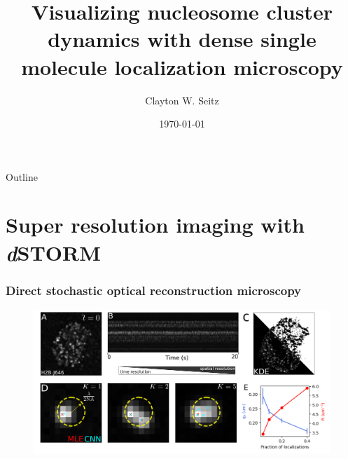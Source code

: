 \documentclass{beamer}					%
\title{Visualizing nucleosome cluster dynamics with dense single molecule localization microscopy}	%
\author{Clayton W. Seitz}								%
\date{\today}									%
\begin{document}
\begin{frame}
  \titlepage
\end{frame}

\begin{frame}{Outline}
    \tableofcontents
\end{frame}



%




\section{Super resolution imaging with \textit{d}STORM}

\begin{frame}
\frametitle{Direct stochastic optical reconstruction microscopy}

\begin{figure}
\includegraphics[width=13cm]{Concept.png}
\end{figure}


\end{frame}
\end{document}
